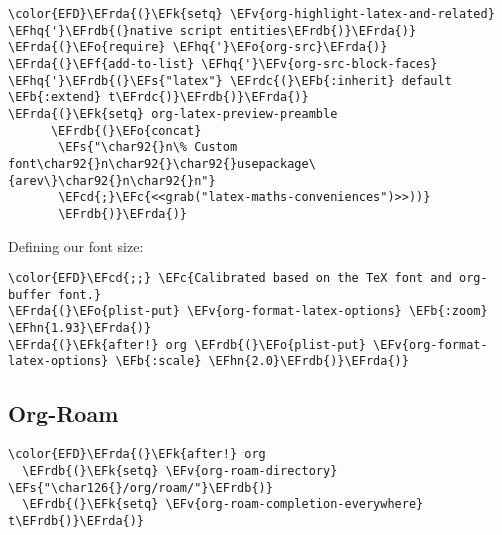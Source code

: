 \documentclass{article}
\newcommand{\EFc}[1]{\textcolor{EFc}{#1}} %
\newcommand{\EFcd}[1]{\textcolor{EFcd}{#1}} %
\newcommand{\EFs}[1]{\textcolor{EFs}{#1}} %
\newcommand{\EFk}[1]{\textcolor{EFk}{#1}} %
\newcommand{\EFb}[1]{\textcolor{EFb}{#1}} %
\newcommand{\EFf}[1]{\textcolor{EFf}{#1}} %
\newcommand{\EFv}[1]{\textcolor{EFv}{#1}} %
\newcommand{\EFo}[1]{\textcolor{EFo}{#1}} %
\newcommand{\EFhn}[1]{\textcolor{EFhn}{\textbf{#1}}} %
\newcommand{\EFhq}[1]{#1} %
\newcommand{\EFrda}[1]{\textcolor{EFrda}{#1}} %
\newcommand{\EFrdb}[1]{\textcolor{EFrdb}{#1}} %
\newcommand{\EFrdc}[1]{\textcolor{EFrdc}{#1}} %
\begin{document}
\begin{Code}
\begin{Verbatim}
\color{EFD}\EFrda{(}\EFk{setq} \EFv{org-highlight-latex-and-related} \EFhq{'}\EFrdb{(}native script entities\EFrdb{)}\EFrda{)}
\EFrda{(}\EFo{require} \EFhq{'}\EFo{org-src}\EFrda{)}
\EFrda{(}\EFf{add-to-list} \EFhq{'}\EFv{org-src-block-faces} \EFhq{'}\EFrdb{(}\EFs{"latex"} \EFrdc{(}\EFb{:inherit} default \EFb{:extend} t\EFrdc{)}\EFrdb{)}\EFrda{)}
\EFrda{(}\EFk{setq} org-latex-preview-preamble
      \EFrdb{(}\EFo{concat}
       \EFs{"\char92{}n\% Custom font\char92{}n\char92{}\char92{}usepackage\{arev\}\char92{}n\char92{}n"}
       \EFcd{;}\EFc{<<grab("latex-maths-conveniences")>>))}
       \EFrdb{)}\EFrda{)}
\end{Verbatim}
\end{Code}

Defining our font size:
\begin{Code}
\begin{Verbatim}
\color{EFD}\EFcd{;;} \EFc{Calibrated based on the TeX font and org-buffer font.}
\EFrda{(}\EFo{plist-put} \EFv{org-format-latex-options} \EFb{:zoom} \EFhn{1.93}\EFrda{)}
\EFrda{(}\EFk{after!} org \EFrdb{(}\EFo{plist-put} \EFv{org-format-latex-options} \EFb{:scale} \EFhn{2.0}\EFrdb{)}\EFrda{)}
\end{Verbatim}
\end{Code}

\subsection{Org-Roam}
\label{sec:org34f46fa}
\begin{Code}
\begin{Verbatim}
\color{EFD}\EFrda{(}\EFk{after!} org
  \EFrdb{(}\EFk{setq} \EFv{org-roam-directory}  \EFs{"\char126{}/org/roam/"}\EFrdb{)}
  \EFrdb{(}\EFk{setq} \EFv{org-roam-completion-everywhere} t\EFrdb{)}\EFrda{)}
\end{Verbatim}
\end{Code}
\end{document}
